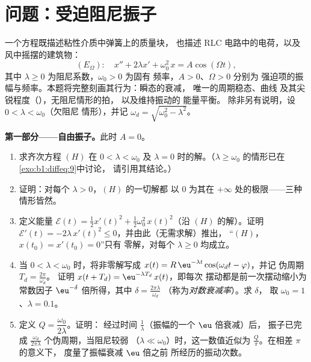 \section{问题：受迫阻尼振子}

\begin{problem}\label{pb:b1:diffeq:1}
一个方程既描述粘性介质中弹簧上的质量块，
也描述 RLC 电路中的电荷，以及风中摇摆的建筑物：
\[
(E_\Omega)\colon\quad
x'' + 2\lambda x' + \omega_0^2\,x = A\cos(\Omega t),
\]
其中 $\lambda \geq 0$ 为阻尼系数，$\omega_0 > 0$ 为固有
频率，$A > 0$、$\Omega > 0$ 分别为
强迫项的振幅与频率。本题将完整刻画其行为：瞬态的衰减，
唯一的周期稳态、曲线
及其尖锐程度（\emph{}），无阻尼情形的拍，
以及维持振动的
能量平衡。
除非另有说明，设 $0 < \lambda < \omega_0$（欠阻尼
情形），并记 $\omega_d = \sqrt{\omega_0^2 - \lambda^2}$。

\medskip
\noindent\textbf{第一部分——自由振子。}此时 $A = 0$。
\begin{enumerate}
  \item 求齐次方程 $(H)$ 在 $0 < \lambda <
        \omega_0$ 及 $\lambda = 0$ 时的解。（$\lambda
        \geq \omega_0$ 的情形已在\cref{exo:b1:diffeq:9}中讨论，
        请引用其结论。）
  \item 证明：对每个 $\lambda > 0$，$(H)$ 的一切解都
        以 $0$ 为其在 $+\infty$ 处的极限——三种情形皆然。
  \item 定义能量 $\mathcal E(t) = \frac12 x'(t)^2 +
        \frac12\omega_0^2\,x(t)^2$（沿 $(H)$ 的解）。证明
        $\mathcal E'(t) = -2\lambda\,x'(t)^2 \leq 0$，并由此（无需求解）推出，
        “$(H)$，$x(t_0) = x'(t_0) = 0$”只有
        零解，对每个 $\lambda \geq 0$ 均成立。
  \item 当 $0 < \lambda < \omega_0$ 时，将非零解写成
        $x(t) = R\,\eu^{-\lambda t}\cos(\omega_d t - \varphi)$，并记
        伪周期 $T_d = \frac{2\pi}{\omega_d}$。
        证明 $x(t + T_d) = \eu^{-\lambda T_d}\,x(t)$，即每次
        摆动都是前一次摆动缩小为常数因子
        $\eu^{-\delta}$ 倍所得，其中 $\delta = \frac{2\pi\lambda}{\omega_d}$
        （称为\emph{对数衰减率}）。求 $\delta$，
        取 $\omega_0 = 1$、$\lambda = 0.1$。
  \item 定义\emph{} $Q =
        \dfrac{\omega_0}{2\lambda}$。证明：
        经过时间 $\frac1\lambda$（振幅的一个 $\eu$ 倍衰减）后，
        振子已完成
        $\frac{\omega_d}{2\pi\lambda}$ 个伪周期，当阻尼较弱
        （$\lambda \ll \omega_0$）时，这一数值近似为
        $\frac Q\pi$。在相差 $\pi$ 的意义下，
        度量了振幅衰减 $\eu$ 倍之前
        所经历的振动次数。
\end{enumerate}


\end{problem}
